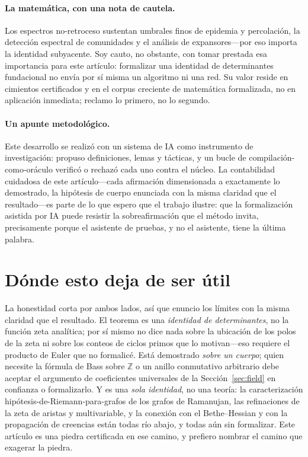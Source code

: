 \documentclass[11pt]{article}
\newcommand{\Z}{\mathbb{Z}}
\begin{document}
\paragraph{La matem\'atica, con una nota de cautela.}
Los espectros no-retroceso sustentan umbrales finos de epidemia y percolaci\'on, la detecci\'on
espectral de comunidades y el an\'alisis de expansores---por eso importa la identidad subyacente. Soy
cauto, no obstante, con tomar prestada esa importancia para este art\'iculo: formalizar una identidad
de determinantes fundacional no env\'ia por s\'i misma un algoritmo ni una red. Su valor reside en
cimientos certificados y en el corpus creciente de matem\'atica formalizada, no en aplicaci\'on
inmediata; reclamo lo primero, no lo segundo.

\paragraph{Un apunte metodol\'ogico.}
Este desarrollo se realiz\'o con un sistema de IA como instrumento de investigaci\'on: propuso
definiciones, lemas y t\'acticas, y un bucle de compilaci\'on-como-or\'aculo verific\'o o rechaz\'o
cada uno contra el n\'ucleo. La contabilidad cuidadosa de este art\'iculo---cada afirmaci\'on
dimensionada a exactamente lo demostrado, la hip\'otesis de cuerpo enunciada con la misma claridad que
el resultado---es parte de lo que espero que el trabajo ilustre: que la formalizaci\'on asistida por
IA puede resistir la sobreafirmaci\'on que el m\'etodo invita, precisamente porque el asistente de
pruebas, y no el asistente, tiene la \'ultima palabra.

\section{D\'onde esto deja de ser \'util}
\label{sec:context}

La honestidad corta por ambos lados, as\'i que enuncio los l\'imites con la misma claridad que el
resultado. El teorema es una \emph{identidad de determinantes}, no la funci\'on zeta anal\'itica; por
s\'i mismo no dice nada sobre la ubicaci\'on de los polos de la zeta ni sobre los conteos de ciclos
primos que lo motivan---eso requiere el producto de Euler que no formalic\'e. Est\'a demostrado
\emph{sobre un cuerpo}; quien necesite la f\'ormula de Bass sobre $\Z$ o un anillo conmutativo
arbitrario debe aceptar el argumento de coeficientes universales de la Secci\'on~\ref{sec:field} en
confianza o formalizarlo. Y es una \emph{sola identidad}, no una teor\'ia: la caracterizaci\'on
hip\'otesis-de-Riemann-para-grafos de los grafos de Ramanujan, las refinaciones de la zeta de aristas
y multivariable, y la conexi\'on con el Bethe--Hessian y con la propagaci\'on de creencias est\'an
todas r\'io abajo, y todas a\'un sin formalizar. Este art\'iculo es una piedra certificada en ese
camino, y prefiero nombrar el camino que exagerar la piedra.
\end{document}
